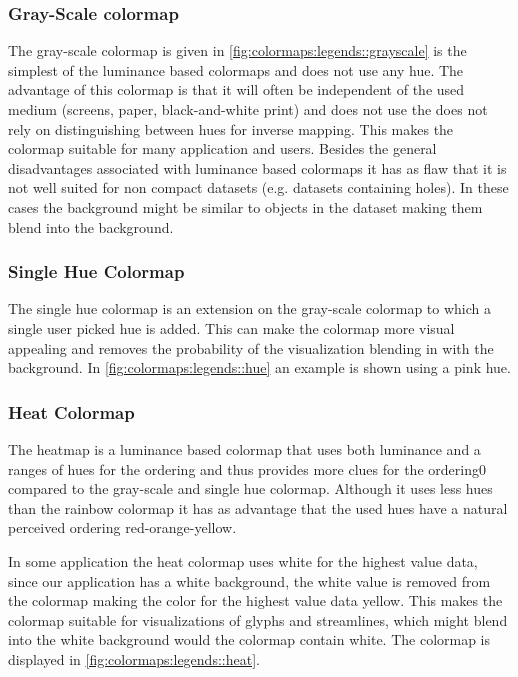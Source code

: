 \subsubsection{Gray-Scale colormap} %
\label{ssub:gray_scale_colormap}
The gray-scale colormap is given in \cref{fig:colormaps:legends::grayscale} is the simplest of the luminance based colormaps and does not use any hue. The advantage of this colormap is that it will often be independent of the used medium (screens, paper, black-and-white print) and does not use the does not rely on distinguishing between hues for inverse mapping. This makes the colormap suitable for many application and users. Besides the general disadvantages associated with luminance based colormaps it has as flaw that it is not well suited for non compact datasets (e.g. datasets containing holes). In these cases the background might be similar to objects in the dataset making them blend into the background.


\subsubsection{Single Hue Colormap} %
\label{ssub:single_hue_colormap}
The single hue colormap is an extension on the gray-scale colormap to which a single user picked hue is added. This can make the colormap more visual appealing and removes the probability of the visualization blending in with the background. In \cref{fig:colormaps:legends::hue} an example is shown using a pink hue.

\subsubsection{Heat Colormap} %
\label{sub:heat__colormap}
The heatmap is a luminance based colormap that uses both luminance and a ranges of hues for the ordering and thus provides more clues for the ordering0 compared to the gray-scale and single hue colormap. Although it uses less hues than the rainbow colormap it has as advantage that the used hues have a natural perceived ordering red-orange-yellow.

In some application the heat colormap uses white for the highest value data, since our application has a white background, the white value is removed from the colormap making the color for the highest value data yellow. This makes the colormap suitable for visualizations of glyphs and streamlines, which might blend into the white background would the colormap contain white. The colormap is displayed in \cref{fig:colormaps:legends::heat}.


